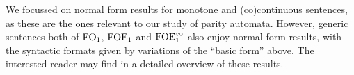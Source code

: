 \begin{remark} We focussed on normal form results for monotone and (co)continuous sentences, as these are the ones relevant to our study of parity automata. However, generic sentences both of $\mathrm{FO}_1$, $\mathrm{FOE}_1$ and $\mathrm{FOE}^{\infty}_1$ also enjoy normal form results, with the syntactic formats given by variations of the ``basic form'' above. The interested reader may find in \cite{???} a detailed overview of these results.
 \end{remark}




